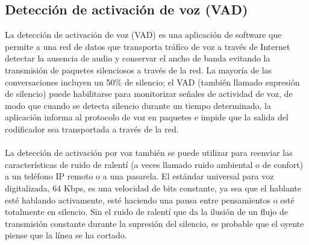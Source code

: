 \documentclass[11pt,letterpaper]{article}
\begin{document}
\subsection{Detección de activación de voz (VAD)}
La detección de activación de voz (VAD) es una aplicación de software que permite a una 
red de datos que transporta tráfico de voz a través de Internet detectar la ausencia de 
audio y conservar el ancho de banda evitando la transmisión de paquetes silenciosos a 
través de la red. La mayoría de las conversaciones incluyen un 50\% de silencio; el VAD 
(también llamado supresión de silencio) puede habilitarse para monitorizar señales 
de actividad de voz, de modo que cuando se detecta silencio durante un tiempo determinado, 
la aplicación informa al protocolo de voz en paquetes e impide que la salida del 
codificador sea transportada a través de la red.
\\ \\
La detección de activación por voz también se puede utilizar para reenviar las 
características de ruido de ralentí (a veces llamado ruido ambiental o de confort) a 
un teléfono IP remoto o a una pasarela. El estándar universal para voz digitalizada, 
64 Kbps, es una velocidad de bits constante, ya sea que el hablante esté hablando 
activamente, esté haciendo una pausa entre pensamientos o esté totalmente en silencio. 
Sin el ruido de ralentí que da la ilusión de un flujo de transmisión constante durante 
la supresión del silencio, es probable que el oyente piense que la línea se ha cortado.
\end{document}
